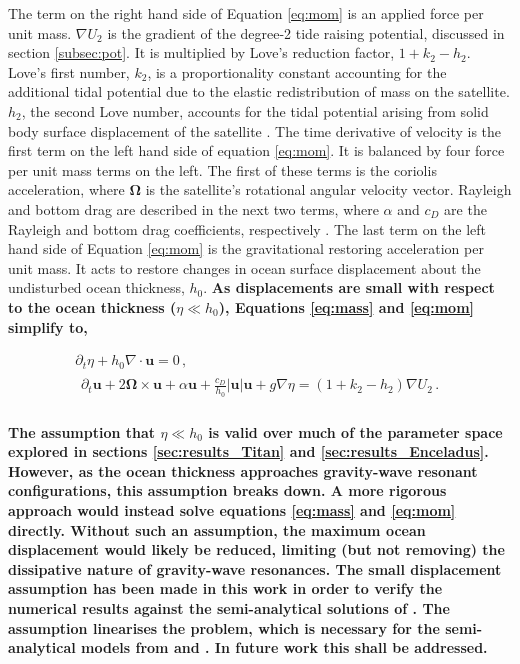 The term on the right hand side of Equation \ref{eq:mom} is an applied force per unit mass. $\nabla U_2$ is the gradient of the degree-2 tide raising potential, discussed in section \ref{subsec:pot}. It is multiplied by Love's reduction factor, $1 + k_2 - h_2$. Love's first number, $k_2$, is a proportionality constant accounting for the additional tidal potential due to the elastic redistribution of mass on the satellite. $h_2$, the second Love number, accounts for the tidal potential arising from solid body surface displacement of the satellite \citep{love1911some}. The time derivative of velocity is the first term on the left hand side of equation  \ref{eq:mom}. It is balanced by four force per unit mass terms on the left. The first of these terms is the coriolis acceleration, where $\bm{\Omega}$ is the satellite's rotational angular velocity vector. Rayleigh and bottom drag are described in the next two terms, where $\alpha$ and $c_D$ are the Rayleigh and bottom drag coefficients, respectively \citep{sears1995tidal,chen2013tidal}. The last term on the left hand side of Equation \ref{eq:mom} is the gravitational restoring acceleration per unit mass. It acts to restore changes in ocean surface displacement about the undisturbed ocean thickness, $h_0$. \textbf{As displacements are small with respect to the ocean thickness ($\eta \ll h_0$),  Equations \ref{eq:mass} and \ref{eq:mom} simplify to,  }

\vspace{-0.5cm}
\begin{gather}
\partial_t \eta + h_0 \nabla \cdot \bm{u} = 0\, , \label{eq:mass_lin}\\
\begin{aligned} 
\partial_t \bm{u} + 2 \bm{\Omega} \times \bm{u} + \alpha\bm{u} + \frac{c_D}{h_0} \left|\bm{u}\right| \bm{u}  + g \nabla \eta = (1 + k_2 - h_2) \nabla U_2 \, . \label{eq:mom_lin}\\
\end{aligned} 
\end{gather}

\noindent \textbf{The assumption that $\eta \ll h_0$ is valid over much of the parameter space explored in sections \ref{sec:results_Titan} and \ref{sec:results_Enceladus}. However, as the ocean thickness approaches gravity-wave resonant configurations, this assumption breaks down. A more rigorous approach would instead solve equations \ref{eq:mass} and \ref{eq:mom} directly. Without such an assumption, the maximum ocean displacement would likely be reduced, limiting (but not removing) the dissipative nature of gravity-wave resonances. The small displacement assumption has been made in this work in order to verify the numerical results against the semi-analytical solutions of \citet{matsuyama2014tidal}. The assumption linearises the problem, which is necessary for the semi-analytical models from \citet{tyler2011tidal} and \citet{matsuyama2014tidal}. In future work this shall be addressed.}      

